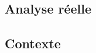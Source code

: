 \documentclass[11pt,a4paper]{article}
\begin{document}
\begin{center}  
\section*{Analyse réelle} 
\end{center}



\subsection*{Contexte}
\end{document}
